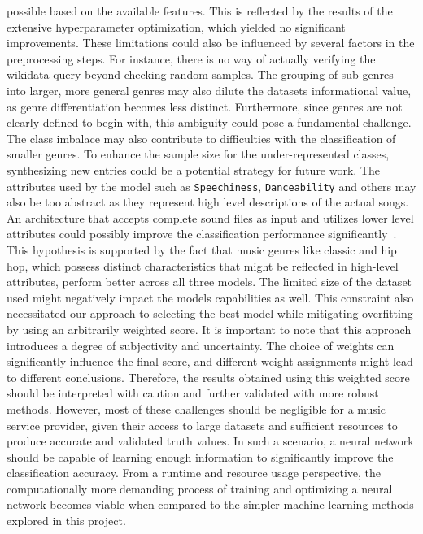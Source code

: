 \documentclass[
  12pt,
  bibliography=totoc,     %
  captions=tableheading,  %
  titlepage=firstiscover, %
]{scrartcl}
\begin{document}
possible based on the available features. This is reflected by the results of the extensive hyperparameter optimization, which yielded no significant improvements.
These limitations could also be influenced by several factors in the preprocessing steps. For instance, there is no way of actually verifying the wikidata query
beyond checking random samples.
The grouping of sub-genres into larger, more general genres may also dilute the datasets informational value, as genre differentiation becomes less distinct.
Furthermore, since genres are not clearly defined to begin with, this ambiguity could pose a fundamental challenge.
The class imbalace may also contribute to difficulties with the classification of smaller genres.
To enhance the sample size for the under-represented classes, synthesizing new entries could be a potential strategy for future work.
The attributes used by the model such as \texttt{Speechiness}, \texttt{Danceability} and others may also be too abstract as they represent high level descriptions
of the actual songs. An architecture that accepts complete sound files as input and utilizes lower level attributes could possibly improve the classification
performance significantly~\cite{Übersicht2011}. This hypothesis is supported by the fact that music genres like classic and hip hop, which possess distinct
characteristics that might be reflected in high-level attributes, perform better across all three models.
The limited size of the dataset used might negatively impact the models capabilities as well. This constraint also necessitated our approach to selecting the best model while
mitigating overfitting by using an arbitrarily weighted score. It is important to note that this approach introduces a degree of subjectivity and uncertainty. The choice of
weights can significantly influence the final score, and different weight assignments might lead to different conclusions. Therefore, the results obtained using this weighted
score should be interpreted with caution and further validated with more robust methods.
However, most of these challenges should be negligible for a music service provider, given their access to large datasets and sufficient resources to produce accurate and
validated truth values. In such a scenario, a neural network should be capable of learning enough information to significantly improve the classification accuracy. From a
runtime and resource usage perspective, the computationally more demanding process of training and optimizing a neural network becomes viable when compared to the simpler
machine learning methods explored in this project.

\newpage
\printbibliography
\end{document}

